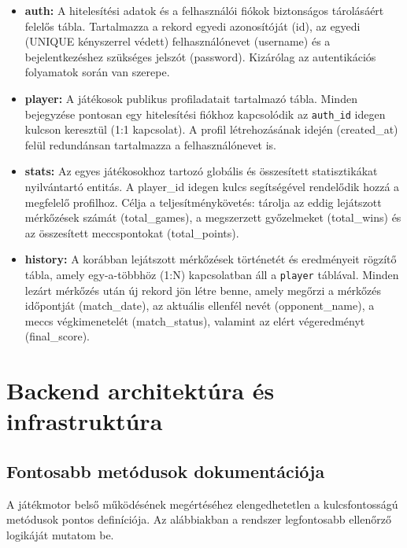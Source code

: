 \begin{itemize}
    \item \textbf{auth:} A hitelesítési adatok és a felhasználói fiókok biztonságos tárolásáért felelős tábla. Tartalmazza a rekord egyedi azonosítóját (id), az egyedi (UNIQUE kényszerrel védett) felhasználónevet (username) és a bejelentkezéshez szükséges jelszót (password). Kizárólag az autentikációs folyamatok során van szerepe.
    
    \item \textbf{player:} A játékosok publikus profiladatait tartalmazó tábla. Minden bejegyzése pontosan egy hitelesítési fiókhoz kapcsolódik az \texttt{auth\_id} idegen kulcson keresztül (1:1 kapcsolat). A profil létrehozásának idején (created\_at) felül redundánsan tartalmazza a felhasználónevet is.
    
    \item \textbf{stats:} Az egyes játékosokhoz tartozó globális és összesített statisztikákat nyilvántartó entitás. A player\_id idegen kulcs segítségével rendelődik hozzá a megfelelő profilhoz. Célja a teljesítménykövetés: tárolja az eddig lejátszott mérkőzések számát (total\_games), a megszerzett győzelmeket (total\_wins) és az összesített meccspontokat (total\_points).
    
    \item \textbf{history:} A korábban lejátszott mérkőzések történetét és eredményeit rögzítő tábla, amely egy-a-többhöz (1:N) kapcsolatban áll a \texttt{player} táblával. Minden lezárt mérkőzés után új rekord jön létre benne, amely megőrzi a mérkőzés időpontját (match\_date), az aktuális ellenfél nevét (opponent\_name), a meccs végkimenetelét (match\_status), valamint az elért végeredményt (final\_score).
\end{itemize}

\section{Backend architektúra és infrastruktúra}

\subsection{Fontosabb metódusok dokumentációja}
\label{subsec:method_docs}

A játékmotor belső működésének megértéséhez elengedhetetlen a kulcsfontosságú metódusok pontos definíciója. Az alábbiakban a rendszer legfontosabb ellenőrző logikáját mutatom be.

